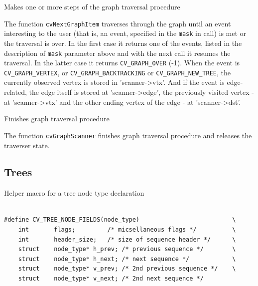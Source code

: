 \label{NextGraphItem}

Makes one or more steps of the graph traversal procedure


\begin{description}
\end{description}

The function \texttt{cvNextGraphItem} traverses through the graph
until an event interesting to the user (that is, an event, specified
in the \texttt{mask} in  call) is met or the
traversal is over. In the first case it returns one of the events,
listed in the description of \texttt{mask} parameter above and with
the next call it resumes the traversal. In the latter case it returns
\texttt{CV\_GRAPH\_OVER} (-1). When the event is \texttt{CV\_GRAPH\_VERTEX},
or \texttt{CV\_GRAPH\_BACKTRACKING} or \texttt{CV\_GRAPH\_NEW\_TREE},
the currently observed vertex is stored in 'scanner->vtx'. And if the
event is edge-related, the edge itself is stored at 'scanner->edge',
the previously visited vertex - at 'scanner->vtx' and the other ending
vertex of the edge - at 'scanner->dst'.

\label{ReleaseGraphScanner}

Finishes graph traversal procedure


\begin{description}
\end{description}


The function \texttt{cvGraphScanner} finishes graph traversal procedure and releases the traverser state.


\subsection{Trees}


\label{CV_TREE_NODE_FIELDS}

Helper macro for a tree node type declaration

\begin{lstlisting}

#define CV_TREE_NODE_FIELDS(node_type)                          \
    int       flags;         /* micsellaneous flags */          \
    int       header_size;   /* size of sequence header */      \
    struct    node_type* h_prev; /* previous sequence */        \
    struct    node_type* h_next; /* next sequence */            \
    struct    node_type* v_prev; /* 2nd previous sequence */    \
    struct    node_type* v_next; /* 2nd next sequence */

\end{lstlisting}

